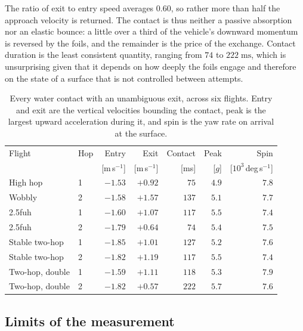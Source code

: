 The ratio of exit to entry speed averages $0.60$, so rather more than half the
approach velocity is returned.  The contact is thus neither a passive
absorption nor an elastic bounce: a little over a third of the vehicle's
downward momentum is reversed by the foils, and the remainder is the price of
the exchange.  Contact duration is the least consistent quantity, ranging from
$74$ to $222\;\mathrm{ms}$, which is unsurprising given that it depends on how
deeply the foils engage and therefore on the state of a surface that is not
controlled between attempts.

\begin{table}[t]
    \centering
    \caption{Every water contact with an unambiguous exit, across six flights.
    Entry and exit are the vertical velocities bounding the contact, peak is
    the largest upward acceleration during it, and spin is the yaw rate on
    arrival at the surface.}
    \label{tab:hop_summary}
    \begin{tabular}{llrrrrr}
        \toprule
        Flight & Hop & Entry & Exit & Contact & Peak & Spin \\
               &     & [m\,s$^{-1}$] & [m\,s$^{-1}$] & [ms] & [$g$] & [$10^3$\,deg\,s$^{-1}$] \\
        \midrule
        High hop        & 1 & $-1.53$ & $+0.92$ & $75$  & $4.9$ & $7.8$ \\
        Wobbly          & 2 & $-1.58$ & $+1.57$ & $137$ & $5.1$ & $7.7$ \\
        2.5fuh          & 1 & $-1.60$ & $+1.07$ & $117$ & $5.5$ & $7.4$ \\
        2.5fuh          & 2 & $-1.79$ & $+0.64$ & $74$  & $5.4$ & $7.5$ \\
        Stable two-hop  & 1 & $-1.85$ & $+1.01$ & $127$ & $5.2$ & $7.6$ \\
        Stable two-hop  & 2 & $-1.82$ & $+1.19$ & $117$ & $5.5$ & $7.4$ \\
        Two-hop, double & 1 & $-1.59$ & $+1.11$ & $118$ & $5.3$ & $7.9$ \\
        Two-hop, double & 2 & $-1.82$ & $+0.57$ & $222$ & $5.7$ & $7.6$ \\
        \bottomrule
    \end{tabular}
\end{table}

\subsection{Limits of the measurement}

